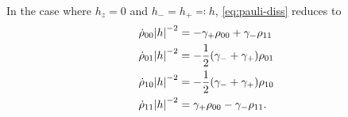 \documentclass[../thesis.tex]{subfiles}
\begin{document}
In the case where $h_z = 0$ and $h_- = h_+ \eqqcolon h$, \cref{eq:pauli-diss}
reduces to
\begin{subequations}
  \begin{align}
    \dot{\rho}_{00} \abs{h}^{-2}
    &= -\gamma_+ \rho_{00}
    + \gamma_- \rho_{11}
    \\
    \dot{\rho}_{01} \abs{h}^{-2}
    &= -\frac{1}{2}\qty(%
    \gamma_-
    + \gamma_+
    ) \rho_{01}
    \\
    \dot{\rho}_{10} \abs{h}^{-2}
    &= -\frac{1}{2}\qty(%
    \gamma_-
    + \gamma_+
    ) \rho_{10}
    \\
    \dot{\rho}_{11} \abs{h}^{-2}
    &= \gamma_+ \rho_{00}
    - \gamma_- \rho_{11}.
  \end{align}\label{eq:pauli-diss-noz}
\end{subequations}
\end{document}
